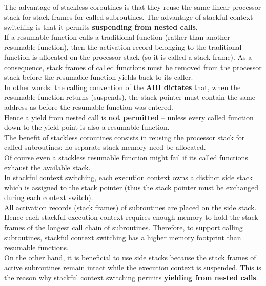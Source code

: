 The advantage of stackless coroutines is that they reuse the same linear
processor stack for stack frames for called subroutines. The advantage of
stackful context switching is that it permits {\bfseries suspending from
nested calls}.\\
\newline
If a resumable function calls a traditional function (rather than another
resumable function), then the activation record belonging to the traditional
function is allocated on the processor stack (so it is called a stack frame).
As a consequence, stack frames of called functions must be removed from the
processor stack before the resumable function yields back to its caller.\\
In other words: the calling convention of the {\bfseries ABI dictates} that,
when the resumable function returns (suspends), the stack pointer must contain
the same address as before the resumable function was entered.\\
Hence a yield from nested call is {\bfseries not permitted} -- unless every
called function down to the yield point is also a resumable function.\\
The benefit of stackless coroutines consists in reusing the processor stack
for called subroutines: no separate stack memory need be allocated.\\
\newline
Of course even a stackless resumable function might fail if its called
functions exhaust the available stack.\\
\newline
In stackful context switching, each execution context owns a
distinct side stack which is assigned to the stack pointer (thus the stack
pointer must be exchanged during each context switch).\\
All activation records (stack frames) of subroutines are placed on the side
stack. Hence each stackful execution context requires enough memory to hold
the stack frames of the longest call chain of subroutines. Therefore, to
support calling subroutines, stackful context switching has a higher memory
footprint than resumable functions.\\
On the other hand, it is beneficial to use side stacks because the stack
frames of active subroutines remain intact while the execution context is
suspended. This is the reason why stackful context switching permits
{\bfseries yielding from nested calls}.

